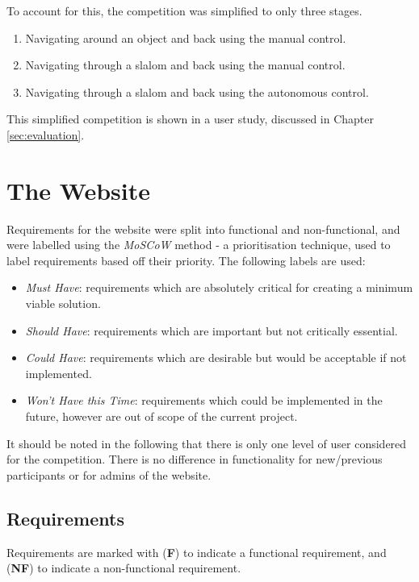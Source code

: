\documentclass{l4proj}
\begin{document}
To account for this, the competition was simplified to only three stages. 
\begin{enumerate}
    \item Navigating around an object and back using the manual control.
    \item Navigating through a slalom and back using the manual control.
    \item Navigating through a slalom and back using the autonomous control.
\end{enumerate}

This simplified competition is shown in a user study, discussed in Chapter \ref{sec:evaluation}.


\section{The Website}\label{sec:web-requirements}
Requirements for the website were split into functional and non-functional, and were labelled using the \textit{MoSCoW} method \citep{MOSCOW} - a prioritisation technique, used to label requirements based off their priority. The following labels are used:

\begin{itemize}
    \item \textit{Must Have}: requirements which are absolutely critical for creating a minimum viable solution.
    \item \textit{Should Have}: requirements which are important but not critically essential. 
    \item \textit{Could Have}: requirements which are desirable but would be acceptable if not implemented.
    \item \textit{Won't Have this Time}: requirements which could be implemented in the future, however are out of scope of the current project.
\end{itemize}

It should be noted in the following that there is only one level of user considered for the competition. There is no difference in functionality for new/previous participants or for admins of the website.

\subsection{Requirements}
Requirements are marked with (\textbf{F}) to indicate a functional requirement, and (\textbf{NF}) to indicate a non-functional requirement.
\end{document}
